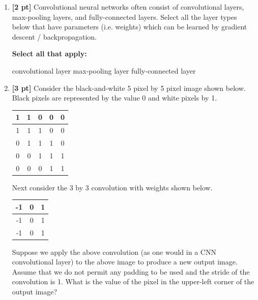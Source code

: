 \documentclass[12pt,addpoints,answers]{exam}
\begin{document}
\begin{enumerate}
    \item {\textbf{[2 pt]}} Convolutional neural networks often consist of convolutional layers, max-pooling layers, and fully-connected layers. Select all the layer types below that have parameters (i.e. weights) which can be learned by gradient descent / backpropagation.
    
    \textbf{Select all that apply:}
    {\checkboxchar{$\Box$} \checkedchar{$\blacksquare$}
        \begin{checkboxes}
            \choice convolutional layer
            \choice max-pooling layer
            \choice fully-connected layer
        \end{checkboxes}
    }
    
    \clearpage
    
    \item {\textbf{[3 pt]}} Consider the black-and-white 5 pixel by 5 pixel image shown below. Black pixels are represented by the value 0 and white pixels by 1.
    
    \begin{center}
    \begin{tabular}{|c|c|c|c|c|}
    \hline
    1 & 1 & 0 & 0 & 0    \\ \hline
    1 & 1 & 1 & 0 & 0    \\ \hline
    0 & 1 & 1 & 1 & 0     \\ \hline
    0 & 0 & 1 & 1 & 1     \\ \hline
    0 & 0 & 0 & 1 & 1     \\ \hline
    \end{tabular}
    \end{center}
    
    Next consider the 3 by 3 convolution with weights shown below.

    \begin{center}
    \begin{tabular}{|c|c|c|}
    \hline
    -1 & 0 & 1    \\ \hline
    -1 & 0 & 1    \\ \hline
    -1 & 0 & 1     \\ \hline
    \end{tabular}
    \end{center}

    Suppose we apply the above convolution (as one would in a CNN convolutional layer) to the above image to produce a new output image. Assume that we do not permit any padding to be used and the stride of the convolution is 1. What is the value of the pixel in the upper-left corner of the output image?
    

\end{enumerate}
\end{document}
